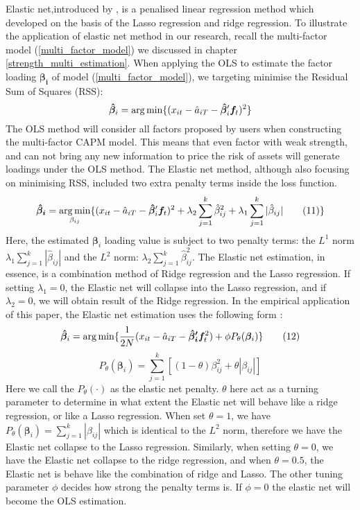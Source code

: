 Elastic net,introduced by ,  is a penalised linear regression method which developed on the basis of the Lasso regression \cite{Tibshirani1996} and ridge regression.
To illustrate the application of elastic net method in our research, recall the multi-factor model (\ref{multi_factor_model}) we discussed in chapter \ref{strength_multi_estimation}.
When applying the OLS to estimate the factor loading $\bm{\beta_{i}}$ of model (\ref{multi_factor_model}), we targeting minimise the Residual Sum of Squares (RSS):
\[  \bm{\hat{\beta}}_i =   \operatorname*{arg\,min}\{  (x_{it} - \hat{a}_{iT} - \bm{\hat{\beta}}_i^{\prime}\bm{f}_t )^2 \}    \]
The OLS method will consider all factors proposed by users when constructing the multi-factor CAPM model.
This means that even factor with weak strength, and can not bring any new information to price the risk of assets will generate loadings under the OLS method.
The Elastic net method, although also focusing on minimising RSS, included two extra penalty terms inside the loss function.
\[   \bm{\hat{\beta}_{i}}  = \operatorname*{arg\,min}_{\beta_{ij}}\{ (x_{it} - \hat{a}_{iT} - \bm{\hat{\beta}}_{i} ^{\prime}\bm{f}_{t})^2 + \lambda_2\sum_{j = 1}^k\hat{\beta}_{ij}^2  + \lambda_1\sum_{j=1}^k|\hat{\beta}_{ij}|  \label{ENcriterion} \tag{11}   \}    \]
Here, the estimated $\bm{\beta}_i$ loading value is subject to two penalty terms: the $L^1$ norm $\lambda_1\sum_{j=1}^k|\hat{\beta}_{ij}|$ and the $L^2$ norm: $\lambda_2\sum_{j = 1}^k\hat{\beta}_{ij}^2$.
The Elastic net estimation, in essence, is a combination method of Ridge regression and the Lasso regression.
If setting $\lambda_1 = 0$, the Elastic net will collapse into the Lasso regression, and if $\lambda_2 = 0$, we will obtain result of the Ridge regression.
In the empirical application of this paper, the Elastic net estimation uses the following form \cite{Friedman2010}:
\[		\bm{\hat{\beta}}_{i} = \operatorname*{arg\,min}\{ \frac{1}{2N} (x_{it}-\hat{a}_{iT} - \bm{\hat{\beta}_{i}^{\prime}}\bm{f}_t ^2 ) +\phi P_{\theta}(\bm{\beta}_i)  \} \label{EN:empirical_formula}\tag{12} \]
\[	P_{\theta}(\bm{\beta}_i) =\sum_{j=1}^k [ (1-\theta)\beta_{ij}^2 + \theta |\beta_{ij}|] \label{EN:elastic_net_penalty} \tag{13}\]
Here we call the $P_{\theta}(\cdot)$ as the elastic net penalty.
$\theta$ here act as a turning parameter to determine in what extent the Elastic net will behave like a ridge regression, or like a Lasso regression.
When set $\theta = 1$, we have $P_{\theta}(\bm{\beta}_i) =\sum_{j=1}^k  |\beta_{ij}|$ which is identical to the $L^2$ norm, therefore we have the Elastic net collapse to the Lasso regression.
Similarly, when setting $\theta = 0$, we have the Elastic net collapse to the ridge regression, and when $\theta = 0.5$, the Elastic net is behave like the combination of ridge and Lasso.
The other tuning parameter $\phi$ decides how strong the penalty terms is.
If $\phi = 0$ the elastic net will become the OLS estimation.

